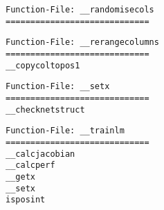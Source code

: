 \begin{verbatim}
Function-File: __randomisecols
=============================
\end{verbatim}
\begin{verbatim}
Function-File: __rerangecolumns
=============================
__copycoltopos1
\end{verbatim}
\begin{verbatim}
Function-File: __setx
=============================
__checknetstruct
\end{verbatim}
\begin{verbatim}
Function-File: __trainlm
=============================
__calcjacobian
__calcperf
__getx
__setx
isposint
\end{verbatim}
